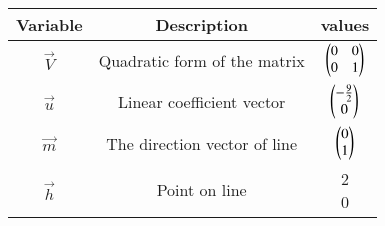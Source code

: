 \begin{tabular}[12pt]{ |c| c| c |}
    \hline
    \textbf{Variable} & \textbf{Description} & \textbf{values}\\ 
    \hline
    $\vec{V}$ & Quadratic form of the matrix & $\begin{pmatrix}0 & 0 \\ 0 & 1\end{pmatrix} $\\
    \hline
    $\vec{u}$ & Linear coefficient vector & $\begin{pmatrix}-\frac{9}{2} \\ 0\end{pmatrix} $\\
    \hline
    $\vec{m}$ & The direction vector of line & $\begin{pmatrix}0 \\ 1\end{pmatrix}$\\
    \hline
     $\vec{h}$ & Point on line & \myvec{2 \\ 0} \\
     \hline
\end{tabular}